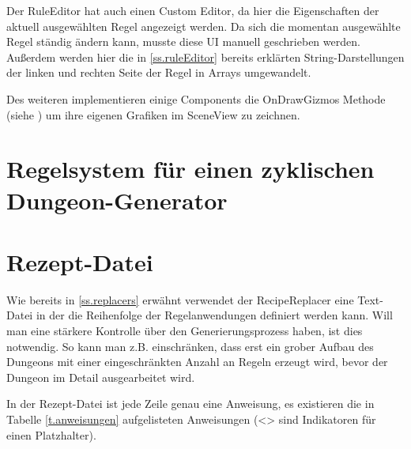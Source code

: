 Der RuleEditor hat auch einen Custom Editor, da hier die Eigenschaften der aktuell ausgewählten Regel angezeigt werden. Da sich die momentan ausgewählte Regel ständig ändern kann, musste diese UI manuell geschrieben werden. Außerdem werden hier die in \ref{ss.ruleEditor} bereits erklärten String-Darstellungen der linken und rechten Seite der Regel in Arrays umgewandelt. 

Des weiteren implementieren einige Components die OnDrawGizmos Methode (siehe \cite[Seite: MonoBehaviour.OnDrawGizmos]{unitySciptingReference}) um ihre eigenen Grafiken im SceneView zu zeichnen. 


\section{Regelsystem für einen zyklischen Dungeon-Generator}\label{s.regelsystem}


\section{Rezept-Datei}\label{s.rezeptDatei}

Wie bereits in \ref{ss.replacers} erwähnt verwendet der RecipeReplacer eine Text-Datei in der die Reihenfolge der Regelanwendungen definiert werden kann. Will man eine stärkere Kontrolle über den Generierungsprozess haben, ist dies notwendig. So kann man z.B. einschränken, dass erst ein grober Aufbau des Dungeons mit einer eingeschränkten Anzahl an Regeln erzeugt wird, bevor der Dungeon im Detail ausgearbeitet wird.

In der Rezept-Datei ist jede Zeile genau eine Anweisung, es existieren die in Tabelle \ref{t.anweisungen} aufgelisteten Anweisungen (<> sind Indikatoren für einen Platzhalter).

